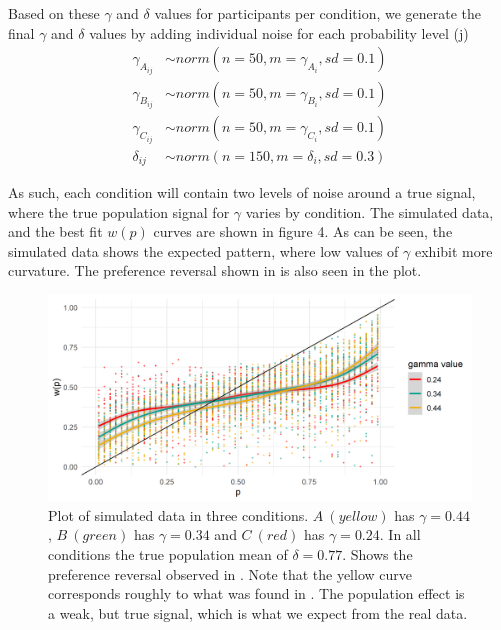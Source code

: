 \documentclass[12pt]{article}
\begin{document}
Based on these $\gamma$ and $\delta$ values for
participants per condition, we generate
the final $\gamma$ and $\delta$ values by
adding individual noise for each probability
level (j)
\begin{equation} \label{eq2}
\begin{split}
	\gamma_{A_{ij}} &\sim norm(n = 50,
	m = \gamma_{A_{i}}, sd = 0.1) \\
	\gamma_{B_{ij}} &\sim norm(n = 50,
	m = \gamma_{B_{i}}, sd = 0.1) \\
	\gamma_{C_{ij}} &\sim norm(n = 50,
	m = \gamma_{C_{i}}, sd = 0.1) \\
	\delta_{ij} &\sim norm(n = 150,
	m = \delta_{i}, sd = 0.3)
\end{split}
\end{equation}

As such, each condition will contain
two levels of noise around a true signal,
where the true population signal for
$\gamma$ varies by condition.
The simulated data, and the best fit
$w(p)$ curves are shown in figure 4.
As can be seen, the simulated data shows
the expected pattern, where low values of
$\gamma$ exhibit more curvature. The preference
reversal shown in \textcite{rottenstreich2001money}
is also seen in the plot.

\begin{figure}[H]
	\includegraphics[width = \linewidth]{../Figures/simulated.png}
	\caption{Plot of simulated data in three
		conditions. $A \: (yellow)$ has
		$\gamma = 0.44$,
		$B \: (green)$ has $\gamma = 0.34$ and
		$C \: (red)$ has $\gamma = 0.24$.
		In all conditions
		the true population mean of
		$\delta = 0.77$. Shows the preference
		reversal observed in
	\textcite{rottenstreich2001money}. Note
	that the yellow curve corresponds
	roughly to what was found in
	\textcite{gonzalez1999shape}.
	The population effect is a
	weak, but true signal, which is
what we expect from the real data.}
\end{figure}
\end{document}
